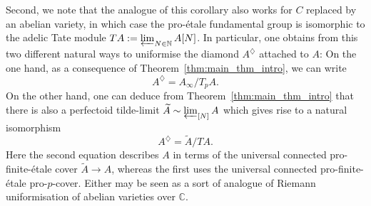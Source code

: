 \documentclass[10pt,oneside]{amsart}
\theoremstyle{definition}
\newcommand{\N}{\mathbb{N}}
\newcommand{\C}{\mathbb{C}}
\begin{document}
Second, we note that the analogue of this corollary also works for $C$ replaced by an abelian variety, in which case the pro-\'etale fundamental group is isomorphic to the adelic Tate module $TA:=\varprojlim_{N\in \N}A[N]$. In particular, one obtains from this two different natural ways to uniformise the diamond $A^{\diamondsuit}$ attached to $A$: On the one hand, as a consequence of Theorem~\ref{thm:main_thm_intro}, we can write
\[ A^{\diamondsuit}=A_\infty/T_pA.\]
On the other hand, one can deduce from Theorem~\ref{thm:main_thm_intro} that there is also a perfectoid tilde-limit $\widetilde{A}\sim \varprojlim_{[N]} A$ which gives rise to a natural isomorphism
\[ A^{\diamondsuit}=\widetilde{A}/T A.\]
Here the second equation describes $A$ in terms of the universal connected pro-finite-\'etale cover $\widetilde{A}\to A$, whereas the first uses the universal connected pro-finite-\'etale pro-$p$-cover.
Either may be seen as a sort of analogue of Riemann uniformisation of abelian varieties over $\C$. 
\end{document}
